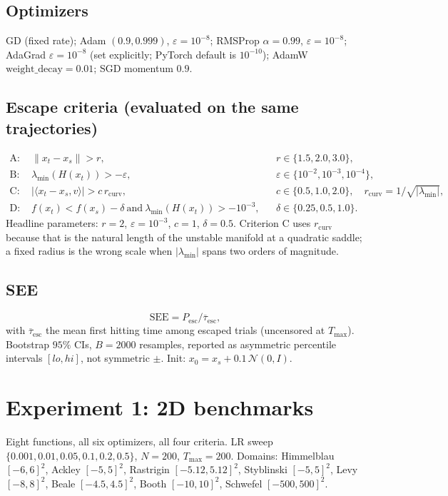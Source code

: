 \documentclass[11pt]{article}
\newcommand{\SEE}{\mathrm{SEE}}
\begin{document}
\subsection{Optimizers}

GD (fixed rate); Adam $(0.9,0.999)$, $\varepsilon=10^{-8}$;
RMSProp $\alpha=0.99$, $\varepsilon=10^{-8}$;
AdaGrad $\varepsilon=10^{-8}$ (set explicitly; PyTorch default is $10^{-10}$);
AdamW $\mathrm{weight\_decay}=0.01$;
SGD momentum $0.9$.

\subsection{Escape criteria (evaluated on the same trajectories)}

\begin{align*}
\text{A: } &\lVert x_t-x_s\rVert > r, && r\in\{1.5,2.0,3.0\},\\
\text{B: } &\lambda_{\min}(H(x_t)) > -\varepsilon, && \varepsilon\in\{10^{-2},10^{-3},10^{-4}\},\\
\text{C: } &\lvert\langle x_t-x_s,v\rangle\rvert > c\,r_{\mathrm{curv}}, &&
  c\in\{0.5,1.0,2.0\},\quad r_{\mathrm{curv}}=1/\sqrt{\lvert\lambda_{\min}\rvert},\\
\text{D: } &f(x_t)<f(x_s)-\delta \ \text{and}\ \lambda_{\min}(H(x_t))>-10^{-3}, &&
  \delta\in\{0.25,0.5,1.0\}.
\end{align*}
Headline parameters: $r=2$, $\varepsilon=10^{-3}$, $c=1$, $\delta=0.5$.
Criterion C uses $r_{\mathrm{curv}}$ because that is the natural length of
the unstable manifold at a quadratic saddle; a fixed radius is the wrong
scale when $|\lambda_{\min}|$ spans two orders of magnitude.

\subsection{SEE}

\[
\SEE = P_{\mathrm{esc}}/\overline{\tau}_{\mathrm{esc}},
\]
with $\overline{\tau}_{\mathrm{esc}}$ the mean first hitting time among
escaped trials (uncensored at $T_{\max}$). Bootstrap $95\%$ CIs, $B=2000$
resamples, reported as asymmetric percentile intervals $[lo,hi]$, not
symmetric $\pm$. Init: $x_0 = x_s + 0.1\,\mathcal{N}(0,I)$.

\section{Experiment 1: 2D benchmarks}

Eight functions, all six optimizers, all four criteria.
LR sweep $\{0.001,0.01,0.05,0.1,0.2,0.5\}$, $N=200$, $T_{\max}=200$.
Domains: Himmelblau $[-6,6]^2$, Ackley $[-5,5]^2$, Rastrigin $[-5.12,5.12]^2$,
Styblinski $[-5,5]^2$, Levy $[-8,8]^2$, Beale $[-4.5,4.5]^2$,
Booth $[-10,10]^2$, Schwefel $[-500,500]^2$.
\end{document}
